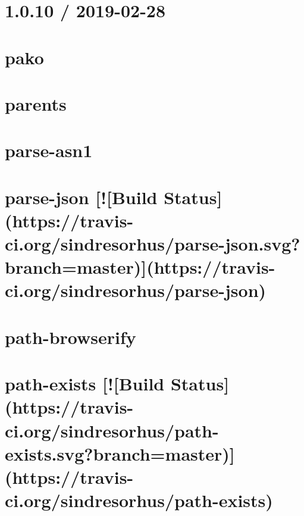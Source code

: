 \documentclass[twoside]{book}
\newcommand{\+}{\discretionary{\mbox{\scriptsize$\hookleftarrow$}}{}{}}
\begin{document}
\chapter{1.0.10 / 2019-\/02-\/28}
\label{md_dsmacc_examples_DRmerge_node_modules_pako_CHANGELOG}

\chapter{pako}
\label{md_dsmacc_examples_DRmerge_node_modules_pako_README}

\chapter{parents}
\label{md_dsmacc_examples_DRmerge_node_modules_parents_readme}

\chapter{parse-\/asn1}
\label{md_dsmacc_examples_DRmerge_node_modules_parse-asn1_README}

\chapter{parse-\/json \mbox{[}!\mbox{[}Build Status\mbox{]}(https\+://travis-\/ci.org/sindresorhus/parse-\/json.svg?branch=master)\mbox{]}(https\+://travis-\/ci.org/sindresorhus/parse-\/json)}
\label{md_dsmacc_examples_DRmerge_node_modules_parse-json_readme}

\chapter{path-\/browserify}
\label{md_dsmacc_examples_DRmerge_node_modules_path-browserify_readme}

\chapter{path-\/exists \mbox{[}!\mbox{[}Build Status\mbox{]}(https\+://travis-\/ci.org/sindresorhus/path-\/exists.svg?branch=master)\mbox{]}(https\+://travis-\/ci.org/sindresorhus/path-\/exists)}
\label{md_dsmacc_examples_DRmerge_node_modules_path-exists_readme}

\end{document}
